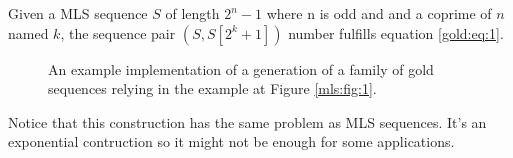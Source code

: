 \begin{property}
  Given a MLS sequence $S$ of length $2^n - 1$ where n is odd and and a
  coprime of $n$ named $k$, the sequence pair $(S, S[2^{k} + 1])$ number
  fulfills equation \ref{gold:eq:1}.
\end{property}

\begin{figure}[ht!]
  \caption{An example implementation of a generation of a family of gold
  sequences relying in the example at Figure \ref{mls:fig:1}.}
  \label{}
\end{figure}

Notice that this construction has the same problem as MLS sequences. It's
an exponential contruction so it might not be enough for some applications.
